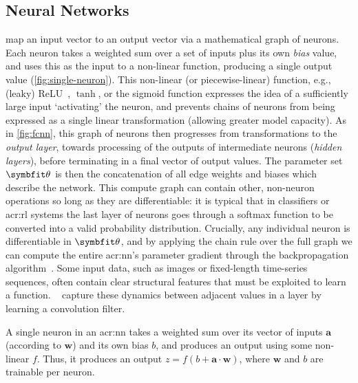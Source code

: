 \subsection{Neural Networks}
 map an input vector to an output vector via a mathematical graph of neurons.
Each neuron takes a weighted sum over a set of inputs plus its own \emph{bias} value, and uses this as the input to a non-linear function, producing a single output value (\cref{fig:single-neuron}).
This non-linear (or piecewise-linear) function, e.g., (leaky) ReLU~\parencite{DBLP:conf/icml/NairH10,leaky-relu}, $\tanh$, or the sigmoid function expresses the idea of a sufficiently large input `activating' the neuron, and prevents chains of neurons from being expressed as a single linear transformation (allowing greater model capacity).
As in \cref{fig:fcnn}, this graph of neurons then progresses from transformations to the \emph{output layer}, towards processing of the outputs of intermediate neurons (\emph{hidden layers}), before terminating in a final vector of output values.
The parameter set $\wvec{}$ is then the concatenation of all edge weights and biases which describe the network.
This compute graph can contain other, non-neuron operations so long as they are differentiable: it is typical that in classifiers or \gls{acr:rl} systems the last layer of neurons goes through a softmax function to be converted into a valid probability distribution.
Crucially, any individual neuron is differentiable in $\wvec{}$, and by applying the chain rule over the full graph we can compute the entire \gls{acr:nn}'s parameter gradient through the backpropagation algorithm~\parencite[pp.~\numrange{197}{217}]{DBLP:books/daglib/0040158}.
Some input data, such as images or fixed-length time-series sequences, often contain clear structural features that must be exploited to learn a function.
~\parencite{LeCun89} capture these dynamics between adjacent values in a layer by learning a convolution filter.

\begin{marginfigure}
	\centering
	\resizebox{0.9\linewidth}{!}{}
	\caption[Operation of a single neuron.]{A single neuron in an \gls{acr:nn} takes a weighted sum over its vector of inputs $\mathbf{a}$ (according to $\mathbf{w}$) and its own bias $b$, and produces an output using some non-linear $f$. Thus, it produces an output $z=f(b + \mathbf{a}\cdot\mathbf{w})$, where $\mathbf{w}$ and $b$ are trainable per neuron.}\label{fig:single-neuron}
\end{marginfigure}


